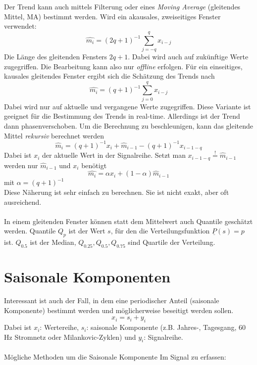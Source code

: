 Der Trend kann auch mittels Filterung oder eines \textsl{Moving Average} (gleitendes Mittel, MA) bestimmt werden. Wird ein akausales, zweiseitiges Fenster verwendet:
\begin{equation}
\hat{m_i}=(2q+1)^{-1}\sum\limits_{j=-q}^q x_{i-j}
\end{equation}
Die Länge des gleitenden Fensters $2q + 1$. Dabei wird auch auf zukünftige Werte zugegriffen. Die Bearbeitung kann also nur \textsl{offline} erfolgen. Für ein einseitiges, kausales gleitendes Fenster ergibt sich die Schätzung des Trends nach
\begin{equation}
\hat{m_i}=(q+1)^{-1}\sum\limits_{j=0}^q x_{i-j}
\end{equation}
Dabei wird nur auf aktuelle und vergangene Werte zugegriffen. Diese Variante ist geeignet für die Bestimmung des Trends in real-time. Allerdings ist der Trend dann phasenverschoben. Um die Berechnung zu beschleunigen, kann das gleitende Mittel \textit{rekursiv} berechnet werden
\begin{equation}
\hat m_i=(q+1)^{-1} x_i +  \hat m_{i-1}-(q+1)^{-1} x_{i-1-q}
\end{equation}
Dabei ist $x_i$ der aktuelle Wert in der Signalreihe. Setzt man $x_{i-1-q}\stackrel{!}{=}\hat m_{i-1}$ werden nur $\hat m_{i-1}$ und $x_i$ benötigt
\begin{equation}
\hat{m_i}= \alpha x_i + (1-\alpha) \hat m_{i-1}
\end{equation}
{\small mit $\alpha = (q+1)^{-1}$}\\
Diese Näherung ist sehr einfach zu berechnen. Sie ist nicht exakt, aber oft ausreichend.\\\\
In einem gleitenden Fenster können statt dem Mittelwert auch Quantile geschätzt werden. Quantile $Q_p$ ist der Wert $s$, für den die Verteilungsfunktion $\underline P(s)=p$ ist. $Q_{0.5}$ ist der Median, $Q_{0.25},Q_{0.5},Q_{0.75}$ sind Quartile der Verteilung.

\section{Saisonale Komponenten}
Interessant ist auch der Fall, in dem eine periodischer Anteil (saisonale Komponente) bestimmt werden und möglicherweise beseitigt werden sollen.
\[
x_i=s_i + y_i
\]
{\small Dabei ist $x_i$: Wertereihe, $s_i$: saisonale Komponente (z.B. Jahres-, Tagesgang, 60 Hz Stromnetz oder Milankovic-Zyklen) und $y_i$: Signalreihe.}\\\\
Mögliche Methoden um die Saisonale Komponente Im Signal zu erfassen:

